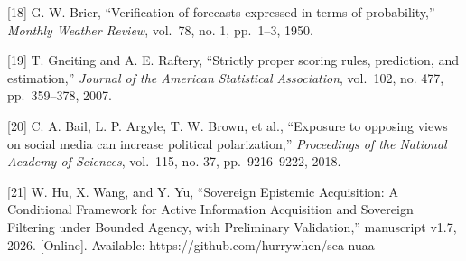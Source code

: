 \documentclass[
  chinese,
  conference,10pt]{IEEEtran}
\begin{document}
{[}18{]} G. W. Brier, ``Verification of forecasts expressed in terms of probability,'' \emph{Monthly Weather Review}, vol.~78, no. 1, pp.~1--3, 1950.

{[}19{]} T. Gneiting and A. E. Raftery, ``Strictly proper scoring rules, prediction, and estimation,'' \emph{Journal of the American Statistical Association}, vol.~102, no. 477, pp.~359--378, 2007.

{[}20{]} C. A. Bail, L. P. Argyle, T. W. Brown, et al., ``Exposure to opposing views on social media can increase political polarization,'' \emph{Proceedings of the National Academy of Sciences}, vol.~115, no. 37, pp.~9216--9222, 2018.

{[}21{]} W. Hu, X. Wang, and Y. Yu, ``Sovereign Epistemic Acquisition: A Conditional Framework for Active Information Acquisition and Sovereign Filtering under Bounded Agency, with Preliminary Validation,'' manuscript v1.7, 2026. {[}Online{]}. Available: https://github.com/hurrywhen/sea-nuaa

\endgroup
\end{document}
